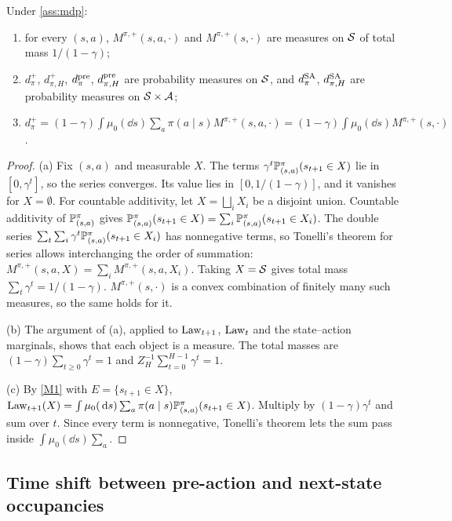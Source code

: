 \begin{proposition}\label{prop:occ-norm}
Under \cref{ass:mdp}:
\begin{enumerate}[nosep,label=(\alph*)]
\item for every $(s,a)$, $M^{\pi,+}(s,a,\cdot)$ and $M^{\pi,+}(s,\cdot)$ are measures on $\mathcal{S}$ of total mass $1/(1-\gamma)$;
\item $d^+_\pi$, $d^+_{\pi,H}$, $d^{\mathrm{pre}}_\pi$, $d^{\mathrm{pre}}_{\pi,H}$ are probability measures on $\mathcal{S}$, and
  $d^{\mathrm{SA}}_\pi$, $d^{\mathrm{SA}}_{\pi,H}$ are probability measures on $\mathcal{S}\times\mathcal{A}$;
\item $d^+_\pi=(1-\gamma)\int\mu_0(\dd s)\sum_a\pi(a\mid s)M^{\pi,+}(s,a,\cdot)=(1-\gamma)\int\mu_0(\dd s)M^{\pi,+}(s,\cdot)$.
\end{enumerate}
\end{proposition}
\begin{proof}
(a) Fix $(s,a)$ and measurable $X$.
The terms $\gamma^t\mathbb{P}^\pi_{(s,a)}(s_{t+1}\in X)$ lie in $[0,\gamma^t]$, so the series converges.
Its value lies in $[0,1/(1-\gamma)]$, and it vanishes for $X=\emptyset$.
For countable additivity, let $X=\bigsqcup_iX_i$ be a disjoint union.
Countable additivity of $\mathbb{P}^\pi_{(s,a)}$ gives $\mathbb{P}^\pi_{(s,a)}(s_{t+1}\in X)=\sum_i\mathbb{P}^\pi_{(s,a)}(s_{t+1}\in X_i)$.
The double series $\sum_t\sum_i\gamma^t\mathbb{P}^\pi_{(s,a)}(s_{t+1}\in X_i)$ has nonnegative terms, so Tonelli's theorem for series allows interchanging the order of summation:
$M^{\pi,+}(s,a,X)=\sum_iM^{\pi,+}(s,a,X_i)$.
Taking $X=\mathcal{S}$ gives total mass $\sum_t\gamma^t=1/(1-\gamma)$.
$M^{\pi,+}(s,\cdot)$ is a convex combination of finitely many such measures, so the same holds for it.

(b) The argument of (a), applied to $\mathrm{Law}_{t+1}$, $\mathrm{Law}_t$ and the state--action marginals, shows that each object is a measure.
The total masses are $(1-\gamma)\sum_{t\ge0}\gamma^t=1$ and $Z_H^{-1}\sum_{t=0}^{H-1}\gamma^t=1$.

(c) By \ref{M1} with $E=\{s_{t+1}\in X\}$,
$\mathrm{Law}_{t+1}(X)=\int\mu_0(\,\mathrm{d} s)\sum_a\pi(a\mid s)\mathbb{P}^\pi_{(s,a)}(s_{t+1}\in X)$.
Multiply by $(1-\gamma)\gamma^t$ and sum over $t$.
Since every term is nonnegative, Tonelli's theorem lets the sum pass inside $\int\mu_0(\dd s)\sum_a$.
\end{proof}

\subsection{Time shift between pre-action and next-state occupancies}\label{sec:occ-shift}


